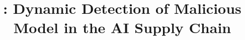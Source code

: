 \documentclass[10pt,conference]{IEEEtran}
\begin{document}
\title{\toolname{}: Dynamic Detection of Malicious Model in the AI Supply Chain}



\maketitle















\clearpage
\newpage

\end{document}
